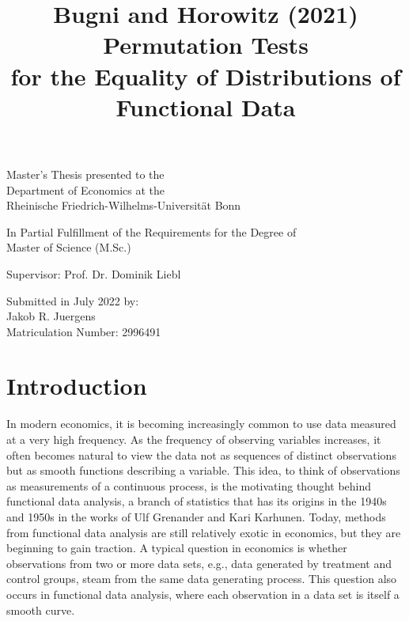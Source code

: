 \documentclass[12pt, a4paper]{article}
\theoremstyle{MAstyle} \newtheorem{assumption}{Assumption}[section]
\theoremstyle{MAstyle} \newtheorem{definition}{Definition}[section]
\theoremstyle{MAstyle} \newtheorem{theorem}{Theorem}[section]
\begin{document}
	
	\title{{\huge Bugni and Horowitz (2021) Permutation Tests\\ for the Equality of Distributions of\\ Functional Data}}
	\date{}
	\maketitle
	\thispagestyle{empty}
	\vspace{1.5 cm}
	\begin{center}
		
		\Large
		Master's Thesis presented to the\\
		Department of Economics at the\\
		Rheinische Friedrich-Wilhelms-Universität Bonn
		\vspace{1.5cm}

		\large
		In Partial Fulfillment of the Requirements for the Degree of\\
		Master of Science (M.Sc.)
		
		\vspace{3cm}
		
		Supervisor: Prof. Dr. Dominik Liebl
		
		\vspace{3cm}
		
		Submitted in July 2022 by: \\
		Jakob R. Juergens\\
		Matriculation Number: 2996491
	\end{center}
	
	\newpage
	
	\thispagestyle{empty}
	\tableofcontents
	\thispagestyle{empty}
	
	\newpage
	
	\section{Introduction}
		In modern economics, it is becoming increasingly common to use data measured at a very high frequency. As the frequency of observing variables increases, it often becomes natural to view the data not as sequences of distinct observations but as smooth functions describing a variable.
		This idea, to think of observations as measurements of a continuous process, is the motivating thought behind functional data analysis, a branch of statistics that has its origins in the 1940s and 1950s in the works of Ulf Grenander and Kari Karhunen. Today, methods from functional data analysis are still relatively exotic in economics, but they are beginning to gain traction.
		A typical question in economics is whether observations from two or more data sets, e.g., data generated by treatment and control groups, steam from the same data generating process.			
		This question also occurs in functional data analysis, where each observation in a data set is itself a smooth curve. \\
		
\end{document}
